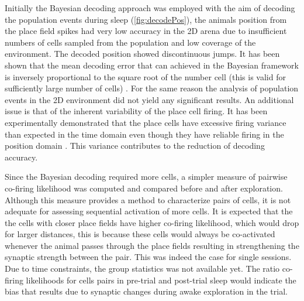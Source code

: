 Initially the Bayesian decoding approach was employed with the aim of decoding the population events during sleep (\autoref{fig:decodePos}), the animals position from the place field spikes had very low accuracy in the 2D arena due to insufficient numbers of cells sampled from the population and low coverage of the environment. The decoded position showed discontinuous jumps. It has been shown that the mean decoding error that can achieved in the Bayesian framework is inversely proportional to the square root of the number cell (this is valid for sufficiently large number of cells) \cite{Zhang2013}. For the same reason the analysis of population events in the 2D environment did not yield any significant results. An additional issue is that of the inherent variability of the place cell firing. It has been experimentally demonstrated that the place cells have excessive firing variance than expected in the time domain even though they have reliable firing in the position domain \cite{Fenton1998}. This variance contributes to the reduction of decoding accuracy.  

Since the Bayesian decoding required more cells, a simpler measure of pairwise co-firing likelihood was computed and compared before and after exploration. Although this measure provides a method to characterize pairs of cells, it is not adequate for assessing sequential activation of more cells. It is expected that the the cells with closer place fields have higher co-firing likelihood, which would drop for larger distances, this is because these cells would always be co-activated whenever the animal passes through the place fields resulting in strengthening the synaptic strength between the pair. This was indeed the case for single sessions. Due to time constraints, the group statistics was not available yet. The ratio co-firing likelihoods for cells pairs in pre-trial and post-trial sleep would indicate the bias that results due to synaptic changes during awake exploration in the trial. 

